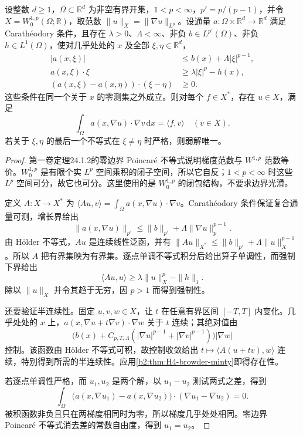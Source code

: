 \begin{theorem}[单调通量的零边界弱解]\label{b2:thm:H4-monotone-flux}
设整数 \(d\ge1\)，\(\Omega\subset\mathbb R^d\) 为非空有界开集，\(1<p<\infty\)，\(p'=p/(p-1)\)，并令
\(X=W_0^{1,p}(\Omega;\mathbb R)\)，取范数 \(\|u\|_X=\|\nabla u\|_{L^p}\)。设通量 \(a:\Omega\times\mathbb R^d\to\mathbb R^d\) 满足 Carathéodory 条件，且存在 \(\lambda>0\)、\(\Lambda<\infty\)、非负 \(b\in L^{p'}(\Omega)\)、非负 \(h\in L^1(\Omega)\)，使对几乎处处的 \(x\) 及全部 \(\xi,\eta\in\mathbb R^d\)，
\[
 \begin{aligned}
 |a(x,\xi)|&\le b(x)+\Lambda|\xi|^{p-1},\\
 a(x,\xi)\cdot\xi&\ge\lambda|\xi|^p-h(x),\\
 (a(x,\xi)-a(x,\eta))\cdot(\xi-\eta)&\ge0.
 \end{aligned}
\]
这些条件在同一个关于 \(x\) 的零测集之外成立。则对每个 \(f\in X^*\)，存在 \(u\in X\)，满足
\[
 \int_\Omega a(x,\nabla u)\cdot\nabla v\,\mathrm dx
         =\langle f,v\rangle\quad(v\in X).
\]
若关于 \(\xi,\eta\) 的最后一个不等式在 \(\xi\ne\eta\) 时严格，则弱解唯一。
\end{theorem}
\begin{proof}
第一卷定理24.1.2的零边界 Poincaré 不等式说明梯度范数与 \(W^{1,p}\) 范数等价。\(W_0^{1,p}\) 是有限个实 \(L^p\) 空间乘积的闭子空间，所以它自反；\(1<p<\infty\) 时这些 \(L^p\) 空间可分，故它也可分。这里使用的是 \(W_0^{1,p}\) 的闭包结构，不要求边界光滑。

定义 \(A:X\to X^*\) 为
\(\langle Au,v\rangle=\int_\Omega a(x,\nabla u)\cdot\nabla v\)。Carathéodory 条件保证复合通量可测，增长界给出
\[
 \|a(x,\nabla u)\|_{p'}
 \le\|b\|_{p'}+\Lambda\|\nabla u\|_p^{p-1}.
\]
由 Hölder 不等式，\(Au\) 是连续线性泛函，并有
\(\|Au\|_{X^*}\le\|b\|_{p'}+\Lambda\|u\|_X^{p-1}\)。所以 \(A\) 把有界集映为有界集。逐点单调不等式积分后给出算子单调性，而强制下界给出
\[
 \langle Au,u\rangle\ge\lambda\|u\|_X^p-\|h\|_1.
\]
除以 \(\|u\|_X\) 并令其趋于无穷，因 \(p>1\) 而得到强制性。

还要验证半连续性。固定 \(u,v,w\in X\)，让 \(t\) 在任意有界区间 \([-T,T]\) 内变化。几乎处处的 \(x\) 上，\(a(x,\nabla u+t\nabla v)\cdot\nabla w\) 关于 \(t\) 连续；其绝对值由
\[
 \bigl(b(x)+C_{p,T,\Lambda}(|\nabla u|^{p-1}
                                  +|\nabla v|^{p-1})\bigr)|\nabla w|
\]
控制。该函数由 Hölder 不等式可积，故控制收敛给出 \(t\mapsto\langle A(u+tv),w\rangle\) 连续，特别得到所需的半连续性。应用\cref{b2:thm:H4-browder-minty}即得存在性。

若逐点单调性严格，而 \(u_1,u_2\) 是两个解，以 \(u_1-u_2\) 测试两式之差，得到
\[
 \int_\Omega
 \bigl(a(x,\nabla u_1)-a(x,\nabla u_2)\bigr)
             \cdot(\nabla u_1-\nabla u_2)=0.
\]
被积函数非负且只在两梯度相同时为零，所以梯度几乎处处相同。零边界 Poincaré 不等式消去差的常数自由度，得到 \(u_1=u_2\)。
\end{proof}

